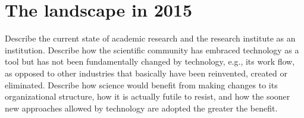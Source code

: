 \section{The landscape in 2015}
Describe the current state of academic research and the research institute as an institution. Describe how the scientific community has embraced technology as a tool but has not been fundamentally changed by technology, e.g., its work flow, as opposed to other industries that basically have been reinvented, created or eliminated. Describe how science would benefit from making changes to its organizational structure, how it is actually futile to resist, and how the sooner new approaches allowed by technology are adopted the greater the benefit.